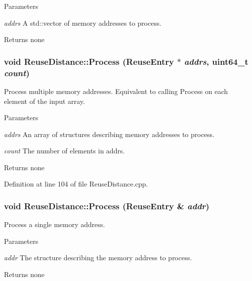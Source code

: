 \begin{DoxyParams}{Parameters}
\item[{\em addrs}]A std::vector of memory addresses to process.\end{DoxyParams}
\begin{DoxyReturn}{Returns}
none 
\end{DoxyReturn}
\hypertarget{class_reuse_distance_aed9cbdd99de67972a37de4624614de9d}{
\subsubsection[{Process}]{\setlength{\rightskip}{0pt plus 5cm}void ReuseDistance::Process ({\bf ReuseEntry} $\ast$ {\em addrs}, \/  uint64\_\-t {\em count})}}
\label{class_reuse_distance_aed9cbdd99de67972a37de4624614de9d}
Process multiple memory addresses. Equivalent to calling Process on each element of the input array.


\begin{DoxyParams}{Parameters}
\item[{\em addrs}]An array of structures describing memory addresses to process. \item[{\em count}]The number of elements in addrs.\end{DoxyParams}
\begin{DoxyReturn}{Returns}
none 
\end{DoxyReturn}


Definition at line 104 of file ReuseDistance.cpp.

\hypertarget{class_reuse_distance_a4ff6b77022ce62e0fdefa5cc297b932a}{
\subsubsection[{Process}]{\setlength{\rightskip}{0pt plus 5cm}void ReuseDistance::Process ({\bf ReuseEntry} \& {\em addr})}}
\label{class_reuse_distance_a4ff6b77022ce62e0fdefa5cc297b932a}
Process a single memory address.


\begin{DoxyParams}{Parameters}
\item[{\em addr}]The structure describing the memory address to process.\end{DoxyParams}
\begin{DoxyReturn}{Returns}
none 
\end{DoxyReturn}


